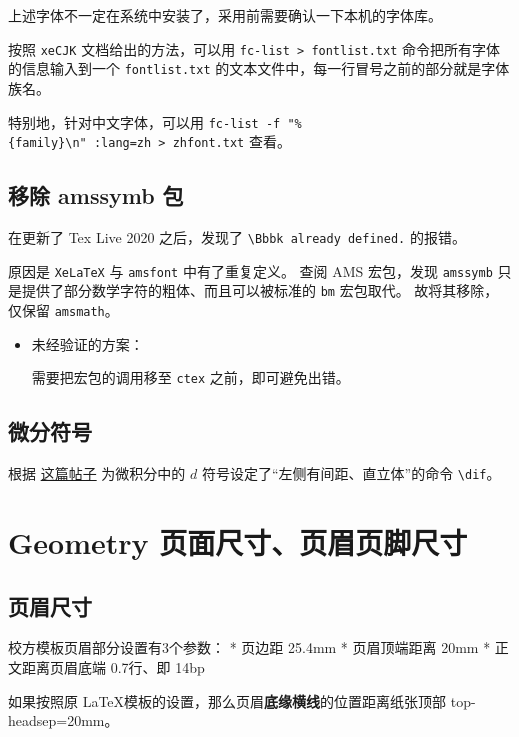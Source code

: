 \documentclass[../Main/thesis.tex]{subfiles}
\begin{document}
上述字体不一定在系统中安装了，采用前需要确认一下本机的字体库。

按照 \texttt{xeCJK} 文档给出的方法，可以用
\texttt{fc-list\ \textgreater{}\ fontlist.txt}
命令把所有字体的信息输入到一个 \texttt{fontlist.txt}
的文本文件中，每一行冒号之前的部分就是字体族名。

特别地，针对中文字体，可以用
\texttt{fc-list\ -f\ "\%\{family\}\textbackslash{}n"\ :lang=zh\ \textgreater{}\ zhfont.txt}
查看。

\subsection{移除 amssymb 包}

在更新了 Tex Live 2020 之后，发现了
\texttt{\textbackslash Bbbk already\ defined.}
的报错。

原因是 \texttt{XeLaTeX} 与 \texttt{amsfont} 中有了重复定义。 查阅 AMS
宏包，发现 \texttt{amssymb}
只是提供了部分数学字符的粗体、而且可以被标准的 \texttt{bm} 宏包取代。
故将其移除，仅保留 \texttt{amsmath}。

\begin{itemize}
\item
  未经验证的方案：

  需要把宏包的调用移至 \texttt{ctex} 之前，即可避免出错。
\end{itemize}

\subsection{微分符号}

根据
\href{https://liam.page/2017/05/01/the-correct-way-to-use-differential-operator/}{这篇帖子}
为微积分中的 \(d\) 符号设定了``左侧有间距、直立体''的命令
\texttt{\textbackslash{}dif}。

\section{Geometry
页面尺寸、页眉页脚尺寸}

\subsection{页眉尺寸}

校方模板页眉部分设置有3个参数： * 页边距 25.4mm * 页眉顶端距离 20mm *
正文距离页眉底端 0.7行、即 14bp

如果按照原 \LaTeX 模板的设置，那么页眉\textbf{底缘横线}的位置距离纸张顶部
top-headsep=20mm。
\end{document}
